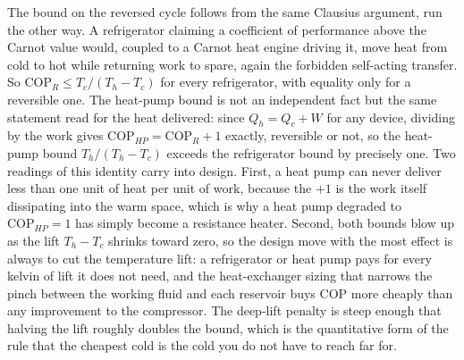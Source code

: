 The bound on the reversed cycle follows from the same Clausius argument,
run the other way. A refrigerator claiming a coefficient of performance
above the Carnot value would, coupled to a Carnot heat engine driving it,
move heat from cold to hot while returning work to spare, again the
forbidden self-acting transfer. So $\text{COP}_R \le T_c/(T_h - T_c)$ for
every refrigerator, with equality only for a reversible one. The heat-pump
bound is not an independent fact but the same statement read for the heat
delivered: since $Q_h = Q_c + W$ for any device, dividing by the work
gives $\text{COP}_{HP} = \text{COP}_R + 1$ exactly, reversible or not, so
the heat-pump bound $T_h/(T_h - T_c)$ exceeds the refrigerator bound by
precisely one. Two readings of this identity carry into design. First, a
heat pump can never deliver less than one unit of heat per unit of work,
because the $+1$ is the work itself dissipating into the warm space, which
is why a heat pump degraded to $\text{COP}_{HP} = 1$ has simply become a
resistance heater. Second, both bounds blow up as the lift $T_h - T_c$
shrinks toward zero, so the design move with the most effect is always
to cut the temperature lift: a refrigerator or heat pump pays for every kelvin of
lift it does not need, and the heat-exchanger sizing that narrows the pinch
between the working fluid and each reservoir buys COP more cheaply than any
improvement to the compressor. The deep-lift penalty is steep enough that
halving the lift roughly doubles the bound, which is the quantitative form
of the rule that the cheapest cold is the cold you do not have to reach
far for.



